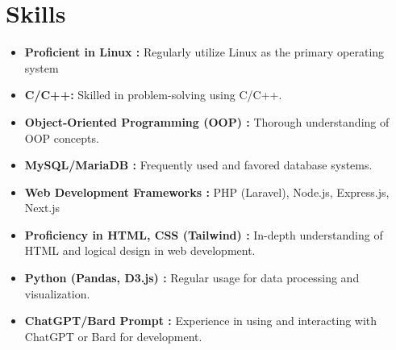 \documentclass[letterpaper,10pt]{article}
\begin{document}
\section{Skills}
  \begin{itemize}[leftmargin=0.15in, label={}]
    \item \textbf{Proficient in Linux : }{Regularly utilize Linux as the primary operating system}
    \item \textbf{C/C++: }{Skilled in problem-solving using C/C++.}
    \item \textbf{Object-Oriented Programming (OOP) : }{Thorough understanding of OOP concepts.}
    \item \textbf{MySQL/MariaDB : }{Frequently used and favored database systems.}
    \item \textbf{Web Development Frameworks : }{PHP (Laravel), Node.js, Express.js, Next.js}
    \item \textbf{Proficiency in HTML, CSS (Tailwind) : }{In-depth understanding of HTML and logical design in web development.}
    \item \textbf{Python (Pandas, D3.js) : }{Regular usage for data processing and visualization.}
    \item \textbf{ChatGPT/Bard Prompt : }{Experience in using and interacting with ChatGPT or Bard for development.}
  \end{itemize}

\end{document}
